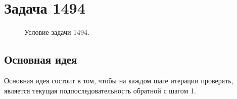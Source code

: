 \documentclass[a5paper, 10pt]{article}
\theoremstyle{definition}
\theoremstyle{plain}
\theoremstyle{remark}
\begin{document}
\newpage
\section{Задача 1494}

\begin{figure}[h]
\caption{Условие задачи 1494.}
\end{figure}


\subsection{Основная идея}
Основная идея состоит в том, чтобы на каждом шаге итерации проверять, является текущая подпоследовательность обратной с шагом 1.
\end{document}
